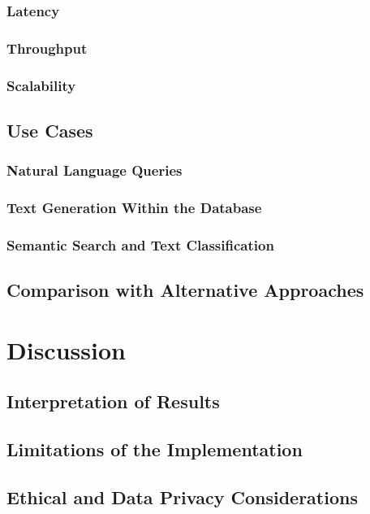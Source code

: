 \documentclass{article}
\begin{document}
\subsubsection{Latency}
\subsubsection{Throughput}
\subsubsection{Scalability}

\subsection{Use Cases}
\subsubsection{Natural Language Queries}
\subsubsection{Text Generation Within the Database}
\subsubsection{Semantic Search and Text Classification}

\subsection{Comparison with Alternative Approaches}

\newpage

\section{Discussion}

\subsection{Interpretation of Results}
\subsection{Limitations of the Implementation}
\subsection{Ethical and Data Privacy Considerations}
\end{document}
